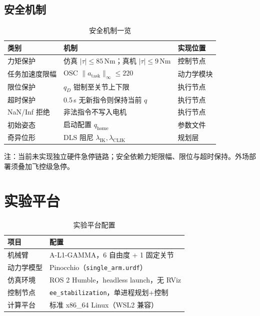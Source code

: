 \documentclass[UTF8, a4paper, 12pt]{ctexart}
\begin{document}
\subsection{安全机制}

\begin{table}[H]
  \centering
  \caption{安全机制一览}
  \label{tab:safety}
  \renewcommand{\arraystretch}{1.2}
  \begin{tabular}{@{} p{2.8cm} p{4.5cm} p{6.5cm} @{}}
    \toprule
    类别 & 机制 & 实现位置 \\
    \midrule
    力矩保护 & 仿真 $|\tau|\le 85$\,Nm；真机 $|\tau|\le 9$\,Nm & 控制节点 \\
    任务加速度限幅 & OSC $\|a_{\mathrm{task}}\|_\infty\le 220$ & 动力学模块 \\
    限位保护 & $q_D$ 钳制至关节上下限 & 执行节点 \\
    超时保护 & 0.5\,s 无新指令则保持当前 $q$ & 执行节点 \\
    NaN/Inf 拒绝 & 非法指令不写入电机 & 执行节点 \\
    初始姿态 & 启动配置 $q_{\mathrm{home}}$ & 参数文件 \\
    奇异位形 & DLS 阻尼 $\lambda_{\mathrm{IK}},\lambda_{\mathrm{CLIK}}$ & 规划层 \\
    \bottomrule
  \end{tabular}
\end{table}

注：当前未实现独立硬件急停链路；安全依赖力矩限幅、限位与超时保持。外场部署须叠加飞控级急停。

\section{实验平台}

\begin{table}[H]
  \centering
  \caption{实验平台配置}
  \label{tab:platform}
  \begin{tabular}{@{} l l @{}}
    \toprule
    项目 & 配置 \\
    \midrule
    机械臂 & A-L1-GAMMA，6 自由度 + 1 固定关节 \\
    动力学模型 & Pinocchio（\texttt{single\_arm.urdf}） \\
    仿真环境 & ROS 2 Humble，headless launch，无 RViz \\
    控制节点 & \texttt{ee\_stabilization}，单进程规划+控制 \\
    计算平台 & 标准 x86\_64 Linux（WSL2 兼容） \\
  \bottomrule
  \end{tabular}
\end{table}
\end{document}
